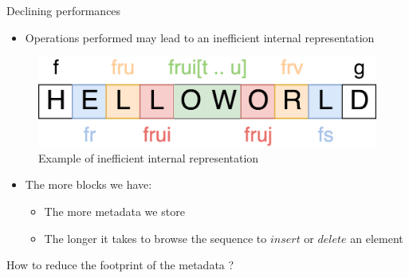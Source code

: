 \documentclass[10pt]{beamer}
\begin{document}
\begin{frame}{Declining performances}
  \begin{itemize}
    \item Operations performed may lead to an inefficient internal representation
  \end{itemize}
  \begin{figure}
    \includegraphics[scale=0.15]{img/worst-case.png}
    \caption{Example of inefficient internal representation}
  \end{figure}
  \begin{itemize}
    \item The more blocks we have:
    \begin{itemize}
      \item The more metadata we store
      \item The longer it takes to browse the sequence to $insert$ or $delete$ an element
    \end{itemize}
  \end{itemize}
\end{frame}

\begin{frame}[standout]
  How to reduce the footprint of the metadata ?
\end{frame}
\end{document}
